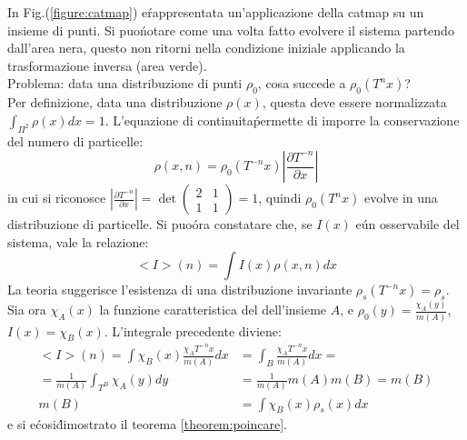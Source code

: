 \documentclass[12pt, a4paper]{book}
\theoremstyle{theorem}
\begin{document}
				In Fig.(\ref{figure:catmap}) e\' rappresentata un'applicazione della catmap su un insieme di punti.
				Si puo\' notare come una volta fatto evolvere il sistema partendo dall'area nera, questo non ritorni nella condizione iniziale applicando la trasformazione inversa (area verde).
				\\
				Problema: data una distribuzione di punti $\rho_{0}$, cosa succede a $\rho_{0}(T^{n}x)$?
				\\
				Per definizione, data una distribuzione $\rho(x)$, questa deve essere normalizzata $\int_{\Pi^{2}}\rho(x)dx=1$.
				L'equazione di continuita\' permette di imporre la conservazione del numero di particelle:
				\begin{equation*}
					\rho(x,n)=\rho_{0}\left(T^{-n}x\right)\left\lvert\frac{\partial T^{-n}}{\partial x}\right\rvert 
				\end{equation*}
				in cui si riconosce $\left\lvert\frac{\partial T^{-n}}{\partial x}\right\rvert=
				\det
				\left(
					\begin{matrix}
						2 & 1\\
						1 & 1 
					\end{matrix}
				\right)=1$, quindi $\rho_{0}\left(T^{n}x\right)$ evolve in una distribuzione di particelle.
				Si puo\' ora constatare che, se $I(x)$ e\' un osservabile del sistema, vale la relazione:
				\begin{equation*}
					<I>(n)=\int I(x)\rho(x,n)dx
				\end{equation*}
				La teoria suggerisce l'esistenza di una distribuzione invariante $\rho_{s}\left(T^{-n}x\right)=\rho_{s}$.
				Sia ora $\chi_{A}(x)$ la funzione caratteristica del dell'insieme $A$, e $\rho_{0}(y)=\frac{\chi_{A}(y)}{m(A)}$, $I(x)=\chi_{B}(x)$.
				L'integrale precedente diviene:
				\begin{equation}
					\begin{split}
						<I>(n)=\int\chi_{B}(x)\frac{\chi_{A}T^{-n}x}{m(A)}dx&=\int_{B}\frac{\chi_{A}T^{-n}x}{m(A)}dx=\\
						=\frac{1}{m(A)}\int_{T^{B}}\chi_{A}(y)dy&=\frac{1}{m(A)}m(A)m(B)=m(B)\\
						m(B)&=\int\chi_{B}(x)\rho_{s}(x)dx
					\end{split}
				\end{equation}
				e si e\' cosi\' dimostrato il teorema \ref{theorem:poincare}.
\end{document}

